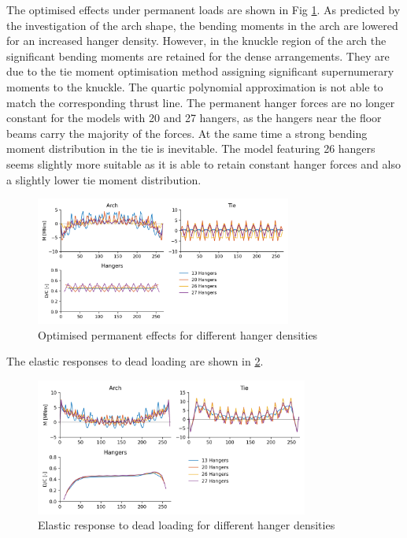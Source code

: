 The optimised effects under permanent loads are shown in Fig \ref{fig:hd_permanent}. As predicted by the investigation of the arch shape, the bending moments in the arch are lowered for an increased hanger density. However, in the knuckle region of the arch the significant bending moments are retained for the dense arrangements. They are due to the tie moment optimisation method assigning significant supernumerary moments to the knuckle. The quartic polynomial approximation is not able to match the corresponding thrust line. The permanent hanger forces are no longer constant for the models with 20 and 27 hangers, as the hangers near the floor beams carry the majority of the forces. At the same time a strong bending moment distribution in the tie is inevitable. The model featuring 26 hangers seems slightly more suitable as it is able to retain constant hanger forces and also a slightly lower tie moment distribution.

\begin{figure}[H]
    \centering
    \includegraphics[width=0.75\textwidth]{calculations/hanger amount comparison/permanent state.png}
    \caption{Optimised permanent effects for different hanger densities}
    \label{fig:hd_permanent}
\end{figure}

The elastic responses to dead loading are shown in \cref{fig:hd_elastic_response_dl}.

\begin{figure}[H]
    \centering
    \includegraphics[width=0.8\textwidth]{calculations/hanger amount comparison/dead load.png}
    \caption{Elastic response to dead loading for different hanger densities}
    \label{fig:hd_elastic_response_dl}
\end{figure}

